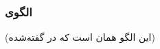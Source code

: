 \subsubsection{الگوی }
\label{ArmoushHWHomoDepSec}
\begin{RTL}
(این الگو همان  است
که در \cite{ref4} گفته‌شده)
\end{RTL}